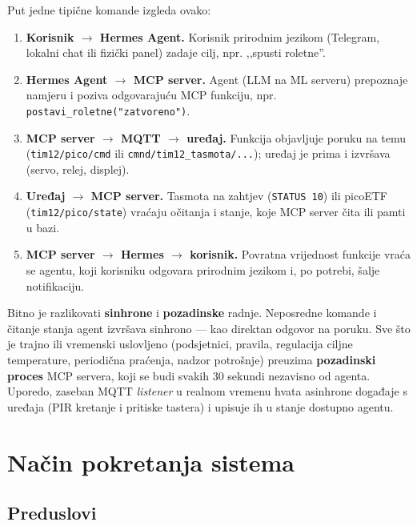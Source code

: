 \documentclass[11pt,a4paper]{article}
\begin{document}
Put jedne tipične komande izgleda ovako:

\begin{enumerate}[nosep]
      \item \textbf{Korisnik $\rightarrow$ Hermes Agent.} Korisnik prirodnim jezikom (Telegram,
            lokalni chat ili fizički panel) zadaje cilj, npr. ,,spusti roletne''.
      \item \textbf{Hermes Agent $\rightarrow$ MCP server.} Agent (LLM na ML serveru) prepoznaje
            namjeru i poziva odgovarajuću MCP funkciju, npr. \texttt{postavi\_roletne("zatvoreno")}.
      \item \textbf{MCP server $\rightarrow$ MQTT $\rightarrow$ uređaj.} Funkcija objavljuje poruku
            na temu (\texttt{tim12/pico/cmd} ili \texttt{cmnd/tim12\_tasmota/...}); uređaj je
            prima i izvršava (servo, relej, displej).
      \item \textbf{Uređaj $\rightarrow$ MCP server.} Tasmota na zahtjev (\texttt{STATUS 10})
            ili picoETF (\texttt{tim12/pico/state}) vraćaju očitanja i stanje, koje MCP server
            čita ili pamti u bazi.
      \item \textbf{MCP server $\rightarrow$ Hermes $\rightarrow$ korisnik.} Povratna vrijednost
            funkcije vraća se agentu, koji korisniku odgovara prirodnim jezikom i, po potrebi,
            šalje notifikaciju.
\end{enumerate}

Bitno je razlikovati \textbf{sinhrone} i \textbf{pozadinske} radnje. Neposredne komande i
čitanje stanja agent izvršava sinhrono --- kao direktan odgovor na poruku. Sve što je trajno
ili vremenski uslovljeno (podsjetnici, pravila, regulacija ciljne temperature, periodična
praćenja, nadzor potrošnje) preuzima \textbf{pozadinski proces} MCP servera, koji se budi
svakih 30 sekundi nezavisno od agenta. Uporedo, zaseban MQTT \emph{listener} u realnom vremenu
hvata asinhrone događaje s uređaja (PIR kretanje i pritiske tastera) i upisuje ih u stanje
dostupno agentu.

\section{Način pokretanja sistema}

\subsection{Preduslovi}
\end{document}
